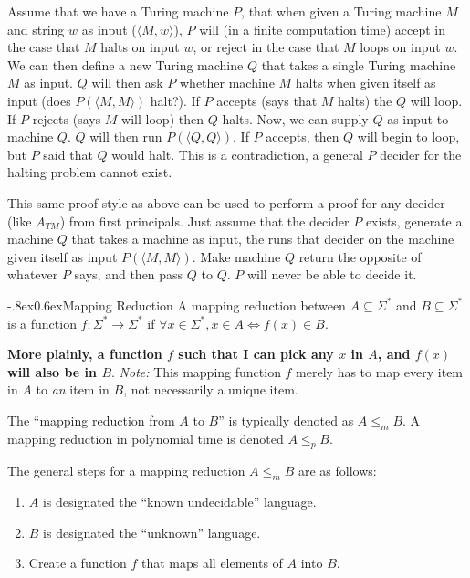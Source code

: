 \documentclass[10pt,landscape]{article}
\makeatletter
\renewcommand{\subsection}{\@startsection{subsection}{2}{0pt}%
                           {-.8ex}{0.6ex}{\normalfont\normalsize\bfseries}}
\makeatother
\begin{document}
\begin{multicols*}{3}
Assume that we have a Turing machine $P$, that when given a Turing machine
$M$ and string $w$ as input ($\langle M, w \rangle$), $P$ will (in a finite
computation time) accept in the case that $M$ halts on input 
$w$, or reject in the case that $M$ loops on input $w$. We can then
define a new Turing machine $Q$ that takes a single Turing machine $M$ 
as input. $Q$ will then ask $P$ whether machine $M$ halts when given
itself as input (does $P(\langle M, M \rangle)$ halt?). If $P$ 
accepts (says that $M$ halts) the $Q$ will loop. If $P$ rejects 
(says $M$ will loop) then $Q$ halts. Now, we can supply $Q$ as input
to machine $Q$. $Q$ will then run $P(\langle Q, Q \rangle)$. If $P$
accepts, then $Q$ will begin to loop, but $P$ said that $Q$ would
halt. This is a contradiction, a general $P$ decider for the halting problem
cannot exist.

This same proof style as above can be used to perform a proof for any decider (like $A_{TM}$)
from first principals. Just assume that the decider $P$ exists, generate a
machine $Q$ that takes a machine as input, the runs that decider on
the machine given itself as input $P(\langle M, M\rangle)$. Make machine $Q$
return the opposite of whatever $P$ says, and then pass $Q$ to $Q$. $P$ will
never be able to decide it.

\subsection{Mapping Reduction}
A mapping reduction between $A \subseteq \Sigma^*$ and 
$B \subseteq \Sigma^*$ is a function $f : \Sigma^* \to \Sigma^*$ if
$\forall x \in \Sigma^*, x \in A \Leftrightarrow f(x) \in B$. 

\textbf{More plainly,
a function $f$ such that I can pick any $x$ in $A$, and $f(x)$ will also
be in $B$}. \textit{Note:} This mapping function $f$ merely has to map
every item in $A$ to \textit{an} item in $B$, not necessarily a unique item.

The ``mapping reduction from $A$ to $B$'' is typically denoted
as $A \leq_m B$. A mapping reduction in polynomial time is denoted
$A \leq_p B$.

The general steps for a mapping reduction $A \leq_m B$ are as follows:
\begin{enumerate}
    \item $A$ is designated the ``known undecidable'' language.
    \item $B$ is designated the ``unknown'' language.
    \item Create a function $f$ that maps all elements of $A$ into $B$. 
\end{enumerate}


\end{multicols*}
\end{document}
